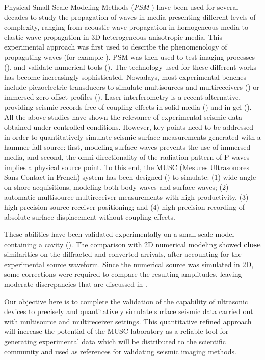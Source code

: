 \documentclass[extra,mreferee]{gji}
\newcommand{\psm}{\textit{PSM} }
\begin{document}
Physical Small Scale Modeling Methods (\psm) have been used for several decades to study the propagation of waves in media presenting different levels of complexity, ranging from acoustic wave propagation in homogeneous media to elastic wave propagation in 3D heterogeneous anisotropic media. This experimental approach was first used to describe the phenomenology of propagating waves (for example \cite{Rieber_EWP_1936,Howes_SMS_1953}). PSM was then used to test imaging processes (\cite{Hilterman_TDM_1970,French_MRP_1974,Bishop_LVM_1985,Pratt_FWI_1999}), and validate numerical tools (\cite{Favretto_NMT_2013}). The technology used for these different works has become increasingly sophisticated. Nowadays, most experimental benches include piezoelectric transducers to simulate multisources and multireceivers (\cite{Wong_SPM_2009}) or immersed zero-offset profiles (\cite{Favretto_NMT_2013}). Laser interferometry is a recent alternative, providing seismic records free of coupling effects in solid media (\cite{_Bodet_2005,_VanWijk_2006,Bretaudeau_SSM_2011,Bretaudeau_FWI_2013}) and in gel (\cite{_decaqueray_2011}). All the above studies have shown the relevance of experimental seismic data obtained under controlled conditions. However, key points need to be addressed in order to quantitatively simulate seismic surface measurements generated with a hammer fall source: first, modeling surface waves prevents the use of immersed media, and second, the omni-directionality of the radiation pattern of P-waves implies a physical source point. To this end, the MUSC (Mesures Ultrasonores Sans Contact in French) system has been designed (\cite{Bretaudeau_SSM_2011}) to simulate: (1) wide-angle on-shore acquisitions, modeling both body waves and surface waves; (2) automatic multisource-multireceiver measurements with high-productivity, (3) high-precision source-receiver positioning; and (4) high-precision recording of absolute surface displacement without coupling effects. 

These abilities have been validated experimentally on a small-scale model containing a cavity (\cite{Bretaudeau_SSM_2011}). The comparison with 2D numerical modeling showed \textbf{close} similarities on the diffracted and converted arrivals, after accounting for the experimental source waveform. Since the numerical source was simulated in 2D, some corrections were required to compare the resulting amplitudes, leaving moderate discrepancies that are discussed in \cite{Bretaudeau_SSM_2011}. 

Our objective here is to complete the validation of the capability of ultrasonic devices to precisely and quantitatively simulate surface seismic data carried out with multisource and multireceiver settings. This quantitative refined approach will increase the potential of the MUSC laboratory as a reliable tool for generating experimental data which will be distributed to the scientific community and used as references for validating seismic imaging methods. %
\end{document}
